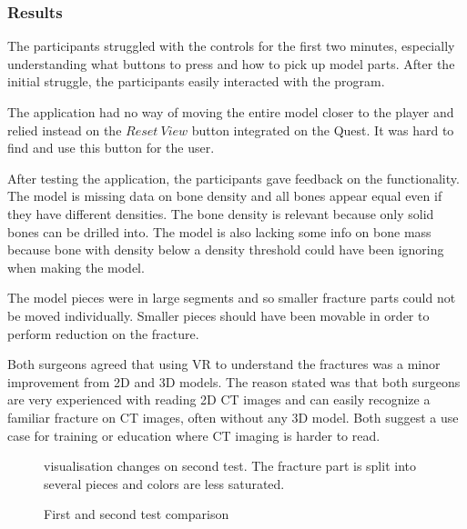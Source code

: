 \documentclass[a4paper]{report}
\begin{document}
\subsubsection{Results}
The participants struggled with the controls for the first two minutes, especially understanding what buttons to press and how to pick up model parts. After the initial struggle, the participants easily interacted with the program.

The application had no way of moving the entire model closer to the player and relied instead on the $Reset\ View$ button integrated on the Quest. It was hard to find and use this button for the user.

After testing the application, the participants gave feedback on the functionality.
The model is missing data on bone density and all bones appear equal even if they have different densities. The bone density is relevant because only solid bones can be drilled into. The model is also lacking some info on bone mass because bone with density below a density threshold could have been ignoring when making the model.

The model pieces were in large segments and so smaller fracture parts could not be moved individually. Smaller pieces should have been movable in order to perform reduction on the fracture.

Both surgeons agreed that using VR to understand the fractures was a minor improvement from 2D and 3D models.
The reason stated was that both surgeons are very experienced with reading 2D CT images and can easily recognize a familiar fracture on CT images, often without any 3D model. Both suggest a use case for training or education where CT imaging is harder to read.


\begin{figure}[h!]
    \centering
	\hfill
	\caption{First and second test comparison}\label{test}
  \small
  visualisation changes on second test. The fracture part is split into several pieces and colors are less saturated.
\end{figure}
\end{document}
